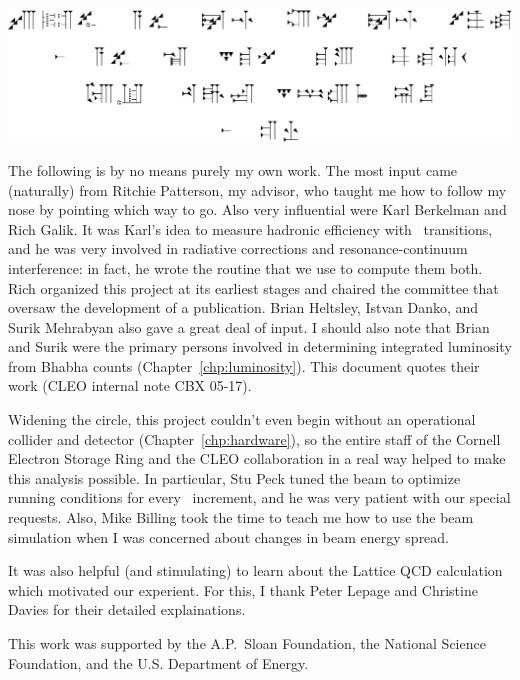 \documentclass{cornell}
\begin{document}
\begin{dedication}
  \includegraphics[width=\linewidth]{newnewplots/dedication}
\end{dedication}
\begin{acknowledgements}
  The following is by no means purely my own work.  The most input
  came (naturally) from Ritchie Patterson, my advisor, who taught me
  how to follow my nose by pointing which way to go.  Also very
  influential were Karl Berkelman and Rich Galik.  It was Karl's idea
  to measure hadronic efficiency with \twotoone\ transitions, and he
  was very involved in radiative corrections and resonance-continuum
  interference: in fact, he wrote the routine that we use to compute
  them both.  Rich organized this project at its earliest stages and
  chaired the committee that oversaw the development of a publication.
  Brian Heltsley, Istvan Danko, and Surik Mehrabyan also gave a great
  deal of input.  I should also note that Brian and Surik were the
  primary persons involved in determining integrated luminosity from
  Bhabha counts (Chapter~\ref{chp:luminosity}).  This document quotes
  their work (CLEO internal note CBX 05-17).

  Widening the circle, this project couldn't even begin without an
  operational collider and detector (Chapter~\ref{chp:hardware}), so
  the entire staff of the Cornell Electron Storage Ring and the CLEO
  collaboration in a real way helped to make this analysis possible.
  In particular, Stu Peck tuned the beam to optimize running
  conditions for every \ecm\ increment, and he was very patient with
  our special requests.  Also, Mike Billing took the time to teach me
  how to use the beam simulation when I was concerned about changes in
  beam energy spread.

  It was also helpful (and stimulating) to learn about the Lattice QCD
  calculation which motivated our experient.  For this, I thank Peter
  Lepage and Christine Davies for their detailed explainations.

  This work was supported by the A.P.~Sloan Foundation, the National
  Science Foundation, and the U.S. Department of Energy.
\end{acknowledgements}
\contentspage
\tablelistpage
\figurelistpage
\end{document}
